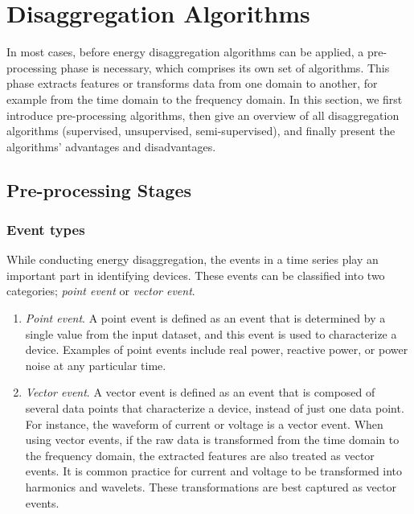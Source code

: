 \section{Disaggregation Algorithms}
\label{sec:algorithms}
In most cases, before energy disaggregation algorithms can be applied, a
pre-processing phase is
necessary, which comprises its own set of algorithms.  
This phase extracts features or transforms data
from one domain to another, for example from the time domain to the frequency domain.
In this section, we first introduce pre-processing algorithms,  
then give an overview of all disaggregation algorithms (supervised, unsupervised, semi-supervised), 
and finally present the algorithms' advantages and disadvantages. 

\subsection{Pre-processing Stages}
\subsubsection{Event types}
While conducting energy disaggregation, the events in a time series play an important part in identifying devices.
These events can be classified into two categories; {\em point event} or
{\em vector event}.
\begin{enumerate}
\item{\textit{Point event}}. 
A point event is defined as an event that is determined by a single value from the input dataset, and 
this event is used to characterize a device.
Examples of point events include real power, reactive power, or
power noise at any particular time. %

\item{\textit{Vector event}}. 
A vector event is defined as an event that is composed of several data points that characterize a device,
instead of just one data point. 
For instance, the waveform of current or voltage is a vector event.
When using vector events, if the raw data is transformed from the time domain to the frequency domain, 
the extracted features are also treated as vector events. It is common practice for current and voltage to be transformed into harmonics and 
wavelets. These transformations are best captured as vector
events.
\end{enumerate}

